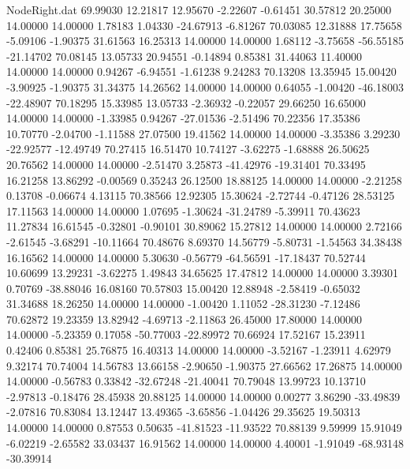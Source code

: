\begin{filecontents}{NodeRight.dat}
  69.99030   12.21817   12.95670    -2.22607   -0.61451   30.57812   20.25000   14.00000   14.00000    1.78183    1.04330  -24.67913   -6.81267
  70.03085   12.31888   17.75658    -5.09106   -1.90375   31.61563   16.25313   14.00000   14.00000    1.68112   -3.75658  -56.55185  -21.14702
  70.08145   13.05733   20.94551    -0.14894    0.85381   31.44063   11.40000   14.00000   14.00000    0.94267   -6.94551   -1.61238    9.24283
  70.13208   13.35945   15.00420    -3.90925   -1.90375   31.34375   14.26562   14.00000   14.00000    0.64055   -1.00420  -46.18003  -22.48907
  70.18295   15.33985   13.05733    -2.36932   -0.22057   29.66250   16.65000   14.00000   14.00000   -1.33985    0.94267  -27.01536   -2.51496
  70.22356   17.35386   10.70770    -2.04700   -1.11588   27.07500   19.41562   14.00000   14.00000   -3.35386    3.29230  -22.92577  -12.49749
  70.27415   16.51470   10.74127    -3.62275   -1.68888   26.50625   20.76562   14.00000   14.00000   -2.51470    3.25873  -41.42976  -19.31401
  70.33495   16.21258   13.86292    -0.00569    0.35243   26.12500   18.88125   14.00000   14.00000   -2.21258    0.13708   -0.06674    4.13115
  70.38566   12.92305   15.30624    -2.72744   -0.47126   28.53125   17.11563   14.00000   14.00000    1.07695   -1.30624  -31.24789   -5.39911
  70.43623   11.27834   16.61545    -0.32801   -0.90101   30.89062   15.27812   14.00000   14.00000    2.72166   -2.61545   -3.68291  -10.11664
  70.48676    8.69370   14.56779    -5.80731   -1.54563   34.38438   16.16562   14.00000   14.00000    5.30630   -0.56779  -64.56591  -17.18437
  70.52744   10.60699   13.29231    -3.62275    1.49843   34.65625   17.47812   14.00000   14.00000    3.39301    0.70769  -38.88046   16.08160
  70.57803   15.00420   12.88948    -2.58419   -0.65032   31.34688   18.26250   14.00000   14.00000   -1.00420    1.11052  -28.31230   -7.12486
  70.62872   19.23359   13.82942    -4.69713   -2.11863   26.45000   17.80000   14.00000   14.00000   -5.23359    0.17058  -50.77003  -22.89972
  70.66924   17.52167   15.23911     0.42406    0.85381   25.76875   16.40313   14.00000   14.00000   -3.52167   -1.23911    4.62979    9.32174
  70.74004   14.56783   13.66158    -2.90650   -1.90375   27.66562   17.26875   14.00000   14.00000   -0.56783    0.33842  -32.67248  -21.40041
  70.79048   13.99723   10.13710    -2.97813   -0.18476   28.45938   20.88125   14.00000   14.00000    0.00277    3.86290  -33.49839   -2.07816
  70.83084   13.12447   13.49365    -3.65856   -1.04426   29.35625   19.50313   14.00000   14.00000    0.87553    0.50635  -41.81523  -11.93522
  70.88139    9.59999   15.91049    -6.02219   -2.65582   33.03437   16.91562   14.00000   14.00000    4.40001   -1.91049  -68.93148  -30.39914

\end{filecontents}
